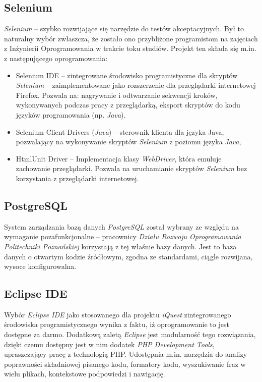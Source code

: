 \subsection{Selenium}
\emph{Selenium} -- szybko rozwijające się narzędzie do testów akceptacyjnych. Był to naturalny wybór zwłaszcza, że zostało ono przybliżone programistom na zajęciach z Inżynierii Oprogramowania w trakcie toku studiów. Projekt ten składa się m.in. z następującego oprogramowania:
\begin{itemize}
\item{Selenium IDE -- zintegrowane środowisko programistyczne dla skryptów \emph{Selenium} -- zaimplementowane jako rozszerzenie dla przeglądarki internetowej Firefox. Pozwala na: nagrywanie i odtwarzanie sekwencji kroków, wykonywanych podczas pracy z przeglądarką, eksport skryptów do kodu języków programowania (np. \emph{Java}).}
\item{Selenium Client Drivers (\emph{Java}) -- sterownik klienta dla języka Java, pozwalający na wykonywanie skryptów \emph{Selenium} z poziomu języka \emph{Java}},
\item{HtmlUnit Driver -- Implementacja klasy \emph{WebDriver}, która emuluje zachowanie przeglądarki. Pozwala na uruchamianie skryptów \emph{Selenium} bez korzystania z przeglądarki internetowej.}
\end{itemize}

\subsection{PostgreSQL}
System zarządzania bazą danych \emph{PostgreSQL} został wybrany ze względu na wymaganie pozafunkcjonalne -- pracownicy \emph{Działu Rozwoju Oprogramowania Politechniki Poznańskiej} korzystają z tej właśnie bazy danych. Jest to baza danych o otwartym kodzie źródłowym, zgodna ze standardami, ciągle rozwijana, wysoce konfigurowalna.

\subsection{Eclipse IDE}
\label{Chapter621}

Wybór \emph{Eclipse IDE} jako stosowanego dla projektu \textit{iQuest} zintegrowanego środowiska programistycznego wynika z faktu, iż oprogramowanie to jest dostępne za darmo. Dodatkową zaletą \textit{Eclipse} jest modularność tego rozwiązania, dzięki czemu dostępny jest w nim dodatek \emph{PHP Development Tools}, upraszczający pracę z technologią PHP. Udostępnia m.in. narzędzia do analizy poprawności składniowej pisanego kodu, formatery kodu, wyszukiwanie fraz w wielu plikach, kontekstowe podpowiedzi i nawigację.

